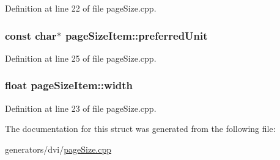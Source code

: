 Definition at line 22 of file page\+Size.\+cpp.

\hypertarget{structpageSizeItem_ae5589189533a4ce5dc3d3c6a4c430581}{
\subsubsection[{preferred\+Unit}]{\setlength{\rightskip}{0pt plus 5cm}const char$\ast$ page\+Size\+Item\+::preferred\+Unit}}\label{structpageSizeItem_ae5589189533a4ce5dc3d3c6a4c430581}


Definition at line 25 of file page\+Size.\+cpp.

\hypertarget{structpageSizeItem_a365e5c8b7ceae8e7a28b4a59bf324240}{
\subsubsection[{width}]{\setlength{\rightskip}{0pt plus 5cm}float page\+Size\+Item\+::width}}\label{structpageSizeItem_a365e5c8b7ceae8e7a28b4a59bf324240}


Definition at line 23 of file page\+Size.\+cpp.



The documentation for this struct was generated from the following file\+:\begin{DoxyCompactItemize}
\item 
generators/dvi/\hyperlink{pageSize_8cpp}{page\+Size.\+cpp}\end{DoxyCompactItemize}
